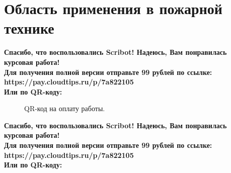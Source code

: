 \documentclass{article}
\begin{document}
\section{Область применения в пожарной технике}
\begin{center}
    \textbf{
        Спасибо, что воспользовались Scribot! Надеюсь, Вам понравилась курсовая работа!\\
        Для получения полной версии отправьте 99 рублей по ссылке:\\
        https://pay.cloudtips.ru/p/7a822105\\
        Или по QR-коду:\\
    }
\end{center}
\begin{figure}[h]
    \caption{QR-код на оплату работы.}
    \label{ris:image}
\end{figure}
\newpage
\begin{center}
    \textbf{
        Спасибо, что воспользовались Scribot! Надеюсь, Вам понравилась курсовая работа!\\
        Для получения полной версии отправьте 99 рублей по ссылке:\\
        https://pay.cloudtips.ru/p/7a822105\\
        Или по QR-коду:\\
    }
\end{center}
\end{document}
